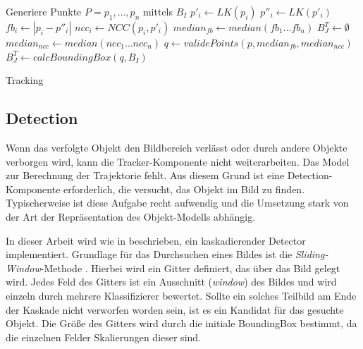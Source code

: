 	\begin{algorithm}[H]
	\vspace{0.2cm}
	Generiere Punkte $P = p_{1},\ldots,p_{n}$ mittels $B_{I}$\;
	 {
		$p'_{i} \leftarrow LK(p_{i})$\;
		$p''_{i} \leftarrow LK(p'_{i})$\;
		$fb_{i} \leftarrow |p_{i}-p''_{i}|$\;
		$ncc_{i} \leftarrow NCC(p_{i},p'_{i})$\;
	}
	$median_{fb}\leftarrow median(fb_{1}\ldots fb_{n})$\;
	 {
		$B_{J}^T \leftarrow \emptyset$\;
	} {
		$median_{ncc} \leftarrow median(ncc_{1}\dots ncc_{n})$\;
		$q \leftarrow validePoints(p,median_{fb},median_{ncc})$\;
		$B_{J}^T \leftarrow calcBoundingBox(q,B_{I})$\;
	}
	\caption{Tracking}
	\label{alg:tracking}
	\vspace{0.2cm}
	\end{algorithm}

	\subsection{Detection}
	\label{subsection:detection}
	Wenn das verfolgte Objekt den Bildbereich verlässt oder durch andere Objekte verborgen wird, kann die Tracker-Komponente nicht weiterarbeiten. Das Model zur Berechnung der Trajektorie fehlt. Aus diesem Grund ist eine Detection-Komponente erforderlich, die versucht, das Objekt im Bild zu finden. Typischerweise ist diese Aufgabe recht aufwendig und die Umsetzung stark von der Art der Repräsentation des Objekt-Modells abhängig.

	In dieser Arbeit wird wie in \cite{TLD} beschrieben, ein kaskadierender Detector implementiert. Grundlage für das Durchsuchen eines Bildes ist die \textit{Sliding-Window}-Methode \cite{key-6}. Hierbei wird ein Gitter definiert, das über das Bild gelegt wird. Jedes Feld des Gitters ist ein Ausschnitt (\textit{window}) des Bildes und wird einzeln durch mehrere Klassifizierer bewertet. Sollte ein solches Teilbild am Ende der Kaskade nicht verworfen worden sein, ist es ein Kandidat für das gesuchte Objekt. Die Größe des Gitters wird durch die initiale BoundingBox bestimmt, da die einzelnen Felder Skalierungen dieser sind.

